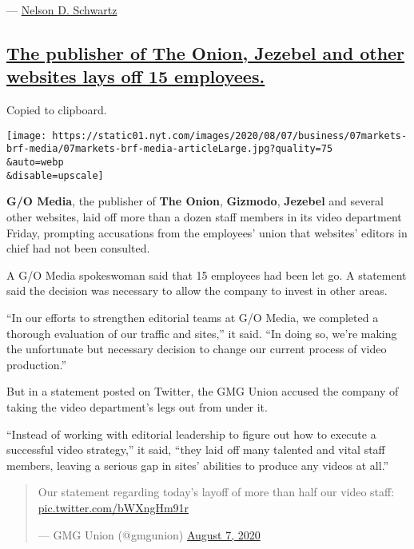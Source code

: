 --- \href{https://www.nytimes.com/by/nelson-d-schwartz}{Nelson D.
Schwartz}

\hypertarget{the-publisher-of-the-onion-jezebel-and-other-websites-lays-off-15-employees}{%
\subsection{\texorpdfstring{\protect\hyperlink{the-publisher-of-the-onion-jezebel-and-other-websites-lays-off-15-employees}{The
publisher of The Onion, Jezebel and other websites lays off 15
employees.}}{The publisher of The Onion, Jezebel and other websites lays off 15 employees.}}\label{the-publisher-of-the-onion-jezebel-and-other-websites-lays-off-15-employees}}

Copied to clipboard.

\texttt{[image: https://static01.nyt.com/images/2020/08/07/business/07markets-brf-media/07markets-brf-media-articleLarge.jpg?quality=75\\\&auto=webp\\\&disable=upscale]}

\textbf{G/O Media}, the publisher of \textbf{The Onion},
\textbf{Gizmodo}, \textbf{Jezebel} and several other websites, laid off
more than a dozen staff members in its video department Friday,
prompting accusations from the employees' union that websites' editors
in chief had not been consulted.

A G/O Media spokeswoman said that 15 employees had been let go. A
statement said the decision was necessary to allow the company to invest
in other areas.

``In our efforts to strengthen editorial teams at G/O Media, we
completed a thorough evaluation of our traffic and sites,'' it said.
``In doing so, we're making the unfortunate but necessary decision to
change our current process of video production.''

But in a statement posted on Twitter, the GMG Union accused the company
of taking the video department's legs out from under it.

``Instead of working with editorial leadership to figure out how to
execute a successful video strategy,'' it said, ``they laid off many
talented and vital staff members, leaving a serious gap in sites'
abilities to produce any videos at all.''

\begin{quote}
Our statement regarding today's layoff of more than half our video
staff: \href{https://t.co/bWXngHm91r}{pic.twitter.com/bWXngHm91r}

--- GMG Union (@gmgunion)
\href{https://twitter.com/gmgunion/status/1291858333868097542?ref_src=twsrc\%5Etfw}{August
7, 2020}
\end{quote}

